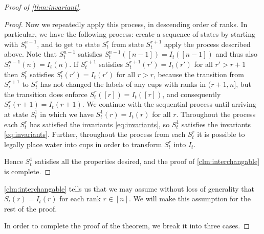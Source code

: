 \documentclass[twocolumn]{article}[10pt]
\begin{document}
\begin{proof}[Proof of \cref{thm:invariant}]
\begin{proof}
Now we repeatedly apply this process, in descending order of ranks. 
In particular, we have the following process: create a sequence of states by
starting with $S_t^{n-1}$, and to get to state $S_t^{r}$ from state $S_t^{r+1}$
apply the process described above. 
Note that $S_t^{n-1}$ satisfies $S_t^{n-1}([n-1]) = I_t([n-1])$ and thus also
$S_t^{n-1}(n) = I_t(n)$.
If $S_t^{r+1}$ satisfies $S_t^{r+1}(r') = I_t(r')$ for all $r'>r+1$ then
$S_t^r$ satisfies $S_t^r(r') = I_t(r')$ for all $r > r$, because the transition
from $S_t^{r+1}$ to $S_t^r$ has not changed the labels of any cups with ranks
in $(r+1, n]$, but the transition does enforce $S_t^r([r]) = I_t([r])$, and
consequently $S_t^r(r+1) = I_t(r+1)$.
We continue with the sequential process until arriving at state $S_t^1$ in
which we have $S_t^1(r) = I_t(r)$ for all $r$.
Throughout the process each $S_t^r$ has satisfied the invariants
\eqref{eq:invariants}, so $S_t^1$ satisfies the invariants
\eqref{eq:invariants}. Further, throughout the process from each $S_t^r$ it is
possible to legally place water into cups in order to transform $S_t^r$ into
$I_t$.

Hence $S_t^1$ satisfies all the properties desired, and the proof of 
\cref{clm:interchangable} is complete.

\end{proof}

\cref{clm:interchangable} tells us that we may assume without loss of
generality that $S_t(r) = I_t(r)$ for each rank $r \in [n]$. We will make
this assumption for the rest of the proof. 

In order to complete the proof of the theorem, we break it into three cases. 


\end{proof}
\end{document}
